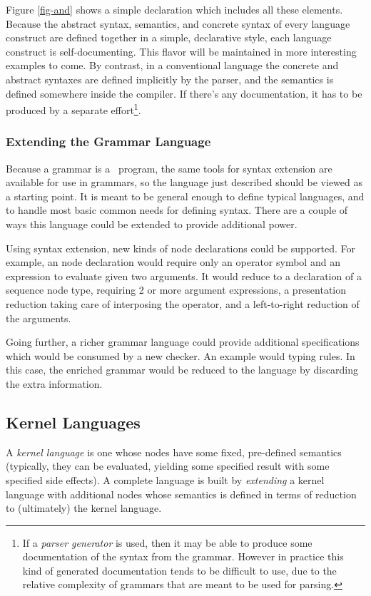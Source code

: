 Figure \ref{fig-and} shows a simple declaration which includes all these elements. Because  the abstract syntax, semantics, and concrete syntax of every language construct are defined together in a simple, declarative style, each language construct is self-documenting. This flavor will be maintained in more interesting examples to come. By contrast, in a conventional language the concrete and abstract syntaxes are defined implicitly by the parser, and the semantics is defined somewhere inside the compiler. If there's any documentation, it has to be produced by a separate effort\footnote{If a \emph{parser generator} is used, then it may be able to produce some documentation of the syntax from the grammar. However in practice this kind of generated documentation tends to be difficult to use, due to the relative complexity of grammars that are meant to be used for parsing.}.


\subsubsection{Extending the Grammar Language}
Because a grammar is a \Meta\ program, the same tools for syntax extension are available for use in grammars, so the  language just described should be viewed as a starting point. It is meant to be general enough to define typical languages, and to handle most basic common needs for defining syntax. There are a couple of ways this language could be extended to provide additional power.

Using syntax extension, new kinds of node declarations could be supported. For example, an  node declaration would require only an operator symbol and an expression to evaluate given two arguments. It would reduce to a declaration of a sequence node type,  requiring 2 or more argument expressions, a presentation reduction taking care of interposing the operator, and a left-to-right reduction of the arguments. 

Going further, a richer grammar language could provide additional specifications which would be consumed by a new checker. An example would typing rules. In this case, the enriched grammar would be reduced to the  language by discarding the extra information.


\subsection{Kernel Languages}
A \emph{kernel language} is one whose nodes have some fixed, pre-defined semantics (typically, they can be evaluated, yielding some specified result with some specified side effects). A complete language is built by \emph{extending} a kernel language with additional nodes whose semantics is defined in terms of reduction to (ultimately) the kernel language.

